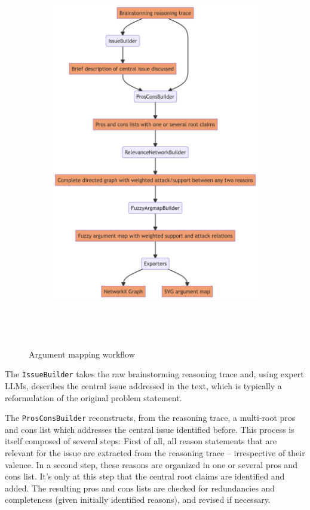 \documentclass[
  letterpaper,
  DIV=11,
  numbers=noendperiod]{scrartcl}
\begin{document}
\begin{figure}

{\centering 

\begin{figure}[H]

{\centering \includegraphics[width=4.5in,height=6.45in]{intro_guided_reasoning_files/figure-latex/mermaid-figure-2.png}

}

\end{figure}

}

\caption{\label{fig-am-workflow}Argument mapping workflow}

\end{figure}

The \texttt{IssueBuilder} takes the raw brainstorming reasoning trace
and, using expert LLMs, describes the central issue addressed in the
text, which is typically a reformulation of the original problem
statement.

The \texttt{ProsConsBuilder} reconstructs, from the reasoning trace, a
multi-root pros and cons list which addresses the central issue
identified before. This process is itself composed of several steps:
First of all, all reason statements that are relevant for the issue are
extracted from the reasoning trace -- irrespective of their valence. In
a second step, these reasons are organized in one or several pros and
cons list. It's only at this step that the central root claims are
identified and added. The resulting pros and cons lists are checked for
redundancies and completeness (given initially identified reasons), and
revised if necessary.
\end{document}
